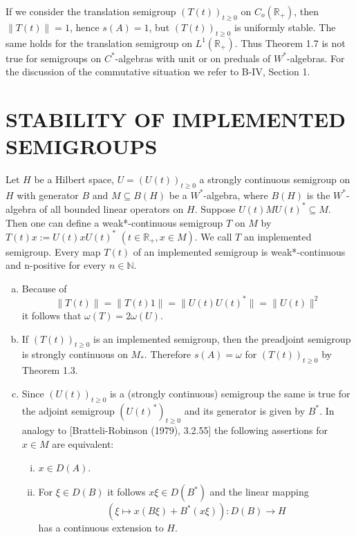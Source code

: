 \newpage

\begin{remark}\label{rem:d4-1-8}
If we consider the translation semigroup $(T(t))_{t \geq 0}$ on $C_{o}(\mathbb{R}_{+})$, then $\|T(t)\| = 1$, hence $s(A) = 1$, but $(T(t))_{t \geq 0}$ is uniformly stable.
The same holds for the translation semigroup on $L^1(\mathbb{R}_{+})$.
Thus Theorem 1.7 is not true for semigroups on $C^*$-algebras with unit or on preduals of $W^*$-algebras.
For the discussion of the commutative situation we refer to B-IV, Section 1.
\end{remark}

\section{STABILITY OF IMPLEMENTED SEMIGROUPS}

Let $H$ be a Hilbert space, $U = (U(t))_{t \geq 0}$ a strongly continuous semigroup on $H$ with generator $B$ and $M \subseteq B(H)$ be a $W^*$-algebra, where $B(H)$ is the $W^*$-algebra of all bounded linear operators on $H$.
Suppose $U(t)MU(t)^* \subseteq M$.
Then one can define a weak*-continuous semigroup $T$ on $M$ by $T(t)x := U(t)xU(t)^*$ $(t \in \mathbb{R}_{+}, x \in M)$.
We call $T$ an implemented semigroup.
Every map $T(t)$ of an implemented semigroup is weak*-continuous and n-positive for every $n \in \mathbb{N}$.

\begin{remarks}\label{rem:d4-2-1}
\begin{enumerate}[(a)]
\item
Because of
\[
\|T(t)\| = \|T(t)1\| = \|U(t)U(t)^*\| = \|U(t)\|^2
\]
it follows that $\omega(T) = 2\omega(U)$.

\item
If $(T(t))_{t \geq 0}$ is an implemented semigroup, then the preadjoint semigroup is strongly continuous on $M_{*}$.
Therefore $s(A) = \omega$ for $(T(t))_{t \geq 0}$ by Theorem 1.3.

\item
Since $(U(t))_{t \geq 0}$ is a (strongly continuous) semigroup the same is true for the adjoint semigroup $(U(t)^*)_{t \geq 0}$ and its generator is given by $B^*$.
In analogy to [Bratteli-Robinson (1979), 3.2.55] the following assertions for $x \in M$ are equivalent:

\begin{enumerate}[(i)]
\item
$x \in D(A)$.

\item
For $\xi \in D(B)$ it follows $x\xi \in D(B^*)$ and the linear mapping
\[
(\xi \mapsto x(B\xi)+B^*(x\xi)): D(B) \to H
\]
has a continuous extension to $H$.
\end{enumerate}
\end{enumerate}
\end{remarks}








